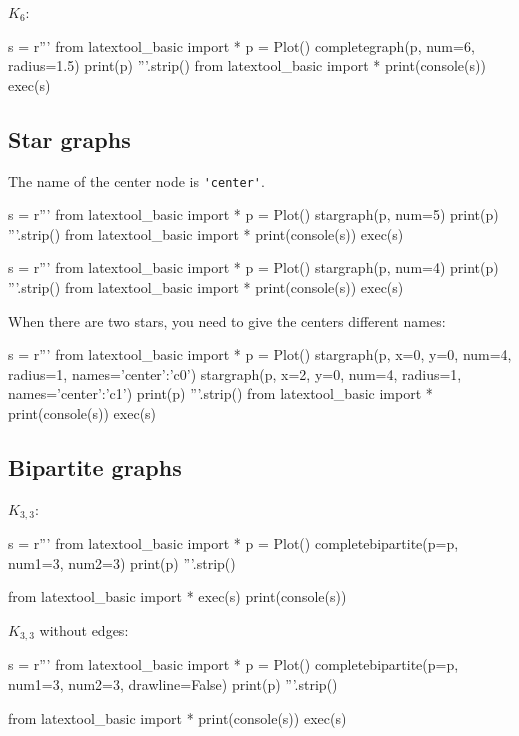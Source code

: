 $K_6$:
\begin{python}
s = r'''
from latextool_basic import *
p = Plot()
completegraph(p, num=6, radius=1.5)
print(p)
'''.strip()
from latextool_basic import *
print(console(s))
exec(s)
\end{python}
  



\newpage
\subsection{Star graphs}

The name of the center node is \verb!'center'!.

\begin{python}
s = r'''
from latextool_basic import *
p = Plot()
stargraph(p, num=5)
print(p)
'''.strip()
from latextool_basic import *
print(console(s))
exec(s)
\end{python}


\begin{python}
s = r'''
from latextool_basic import *
p = Plot()
stargraph(p, num=4)
print(p)
'''.strip()
from latextool_basic import *
print(console(s))
exec(s)
\end{python}


When there are two stars, you need to give the centers different names:
\begin{python}
s = r'''
from latextool_basic import *
p = Plot()
stargraph(p, x=0, y=0, num=4, radius=1, names={'center':'c0'})
stargraph(p, x=2, y=0, num=4, radius=1, names={'center':'c1'})
print(p)
'''.strip()
from latextool_basic import *
print(console(s))
exec(s)
\end{python}





\newpage
\subsection{Bipartite graphs}

$K_{3,3}$:
\begin{python}
s = r'''
from latextool_basic import *
p = Plot()
completebipartite(p=p, num1=3, num2=3)
print(p)
'''.strip()

from latextool_basic import *
exec(s)
print(console(s))
\end{python}


$K_{3,3}$ without edges:
\begin{python}
s = r'''
from latextool_basic import *
p = Plot()
completebipartite(p=p, num1=3, num2=3, drawline=False)
print(p)
'''.strip()

from latextool_basic import *
print(console(s))
exec(s)
\end{python}

